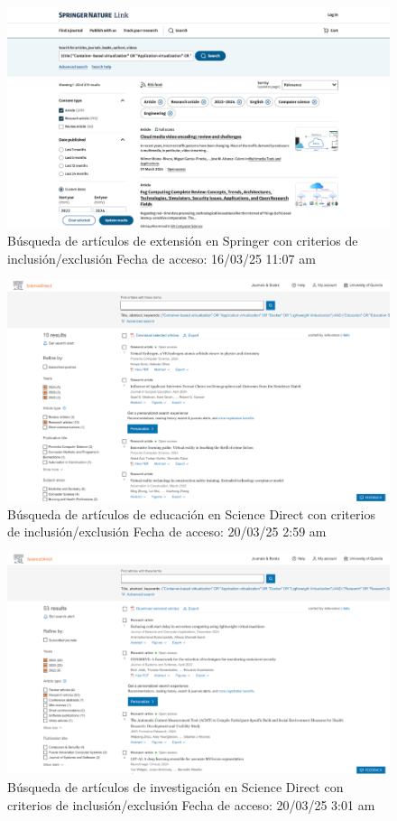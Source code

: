 \FloatBarrier\begin{figure}[H]
	\centering
	\includegraphics[width=\textwidth,keepaspectratio]{apendices/BD/criterios/Springer-ind.png}
	\caption{Búsqueda de artículos de extensión en Springer con criterios de inclusión/exclusión
		Fecha de acceso: 16/03/25 11:07 am
	}\label{fig:busqueda24}
\end{figure}
\FloatBarrier\begin{figure}[H]
	\centering
	\includegraphics[width=\textwidth,keepaspectratio]{apendices/BD/criterios/SD-ed.png}
	\caption{Búsqueda de artículos de educación en Science Direct con criterios de inclusión/exclusión
		Fecha de acceso: 20/03/25 2:59 am
	}\label{fig:busqueda25}
\end{figure}
\FloatBarrier\begin{figure}[H]
	\centering
	\includegraphics[width=\textwidth,keepaspectratio]{apendices/BD/criterios/SD-inv.png}
	\caption{Búsqueda de artículos de investigación en Science Direct con criterios de inclusión/exclusión
		Fecha de acceso: 20/03/25 3:01 am
	}\label{fig:busqueda26}
\end{figure}
